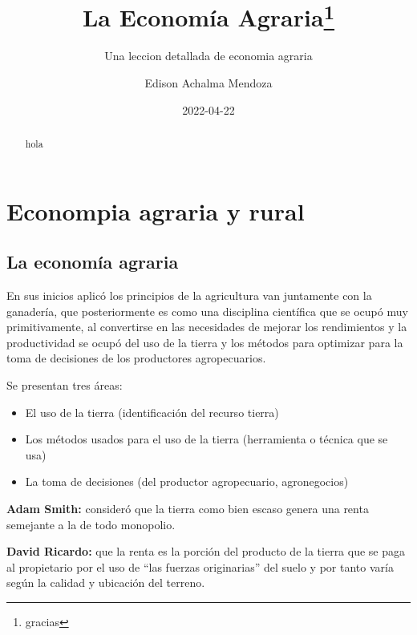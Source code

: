 \documentclass[
  letterpaper,
  DIV=11,
  numbers=noendperiod]{scrartcl}
\title{La Economía Agraria\thanks{gracias}}
\subtitle{Una leccion detallada de economia agraria}
\author{Edison Achalma Mendoza}
\date{2022-04-22}
\begin{document}
\maketitle
\begin{abstract}
hola
\end{abstract}
\ifdefined\Shaded\renewenvironment{Shaded}{\begin{tcolorbox}[borderline west={3pt}{0pt}{shadecolor}, boxrule=0pt, interior hidden, breakable, enhanced, sharp corners, frame hidden]}{\end{tcolorbox}}\fi

\hypertarget{econompia-agraria-y-rural}{%
\section{Econompia agraria y rural}\label{econompia-agraria-y-rural}}

\hypertarget{la-economuxeda-agraria}{%
\subsection{La economía agraria}\label{la-economuxeda-agraria}}

En sus inicios aplicó los principios de la agricultura van juntamente
con la ganadería, que posteriormente es como una disciplina científica
que se ocupó muy primitivamente, al convertirse en las necesidades de
mejorar los rendimientos y la productividad se ocupó del uso de la
tierra y los métodos para optimizar para la toma de decisiones de los
productores agropecuarios.

Se presentan tres áreas:

\begin{itemize}
\item
  El uso de la tierra (identificación del recurso tierra)
\item
  Los métodos usados para el uso de la tierra (herramienta o técnica que
  se usa)
\item
  La toma de decisiones (del productor agropecuario, agronegocios)
\end{itemize}

\textbf{Adam Smith:} consideró que la tierra como bien escaso genera una
renta semejante a la de todo monopolio.

\textbf{David Ricardo:} que la renta es la porción del producto de la
tierra que se paga al propietario por el uso de ``las fuerzas
originarias'' del suelo y por tanto varía según la calidad y ubicación
del terreno.
\end{document}
